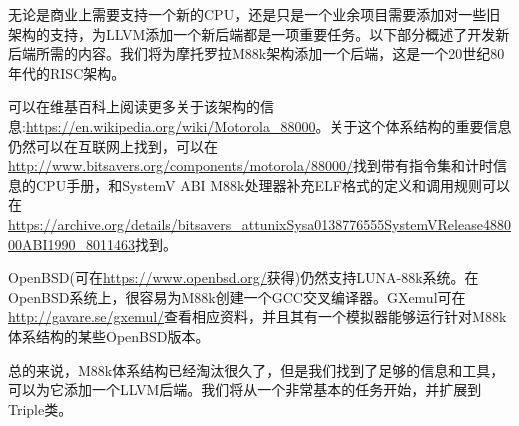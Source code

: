 无论是商业上需要支持一个新的CPU，还是只是一个业余项目需要添加对一些旧架构的支持，为LLVM添加一个新后端都是一项重要任务。以下部分概述了开发新后端所需的内容。我们将为摩托罗拉M88k架构添加一个后端，这是一个20世纪80年代的RISC架构。\par

\begin{tcolorbox}[colback=blue!5!white,colframe=blue!75!black, title=References]
\hspace*{0.7cm}可以在维基百科上阅读更多关于该架构的信息:\url{https://en.wikipedia.org/wiki/Motorola_88000}。关于这个体系结构的重要信息仍然可以在互联网上找到，可以在\url{http://www.bitsavers.org/components/motorola/88000/}找到带有指令集和计时信息的CPU手册，和SystemV ABI M88k处理器补充ELF格式的定义和调用规则可以在\url{https://archive.org/details/bitsavers_attunixSysa0138776555SystemVRelease488000ABI1990_8011463}找到。\par

\hspace*{0.7cm}OpenBSD(可在\url{https://www.openbsd.org/}获得)仍然支持LUNA-88k系统。在OpenBSD系统上，很容易为M88k创建一个GCC交叉编译器。GXemul可在\url{http://gavare.se/gxemul/}查看相应资料，并且其有一个模拟器能够运行针对M88k体系结构的某些OpenBSD版本。
\end{tcolorbox}

总的来说，M88k体系结构已经淘汰很久了，但是我们找到了足够的信息和工具，可以为它添加一个LLVM后端。我们将从一个非常基本的任务开始，并扩展到Triple类。\par




















































